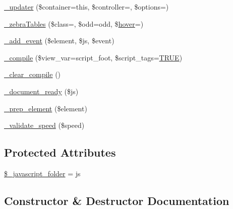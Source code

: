 \begin{DoxyCompactItemize}
\item 
\mbox{\hyperlink{class_c_i___jquery_ad9649192c4d81a3712aa0defc13c7ed3}{\+\_\+updater}} (\$container=\textquotesingle{}this\textquotesingle{}, \$controller=\textquotesingle{}\textquotesingle{}, \$options=\textquotesingle{}\textquotesingle{})
\item 
\mbox{\hyperlink{class_c_i___jquery_ac3aee12f47604782c9999a511d3ea4e5}{\+\_\+zebra\+Tables}} (\$class=\textquotesingle{}\textquotesingle{}, \$odd=\textquotesingle{}odd\textquotesingle{}, \$\mbox{\hyperlink{class_c_i___javascript_a6f8cfdbca8f6b2c2d68bb9a38a8f96a7}{hover}}=\textquotesingle{}\textquotesingle{})
\item 
\mbox{\hyperlink{class_c_i___jquery_acb1530e106b7717d7c031dcb082a0da8}{\+\_\+add\+\_\+event}} (\$element, \$js, \$event)
\item 
\mbox{\hyperlink{class_c_i___jquery_a32374487ab27bcad0bee1bf18a6e6b7a}{\+\_\+compile}} (\$view\+\_\+var=\textquotesingle{}script\+\_\+foot\textquotesingle{}, \$script\+\_\+tags=\mbox{\hyperlink{constants_8php_ae04a3efe6aa42044f803ee90c2277846}{T\+R\+UE}})
\item 
\mbox{\hyperlink{class_c_i___jquery_a8508147ee3b37f58e7c58f365c6c1409}{\+\_\+clear\+\_\+compile}} ()
\item 
\mbox{\hyperlink{class_c_i___jquery_a5d111acaf02096fa67c90954167c202f}{\+\_\+document\+\_\+ready}} (\$js)
\item 
\mbox{\hyperlink{class_c_i___jquery_a6dd4fcc0640975784e69d1ea11eba291}{\+\_\+prep\+\_\+element}} (\$element)
\item 
\mbox{\hyperlink{class_c_i___jquery_aea8d69840297d111305f7b5ff9982573}{\+\_\+validate\+\_\+speed}} (\$speed)
\end{DoxyCompactItemize}
\subsection*{Protected Attributes}
\begin{DoxyCompactItemize}
\item 
\mbox{\hyperlink{class_c_i___jquery_a078b6ad01e6de9b28c6ff3afa31c55db}{\$\+\_\+javascript\+\_\+folder}} = \textquotesingle{}js\textquotesingle{}
\end{DoxyCompactItemize}


\subsection{Constructor \& Destructor Documentation}
\mbox{\label{class_c_i___jquery_a9162320adff1a1a4afd7f2372f753a3e}} 
